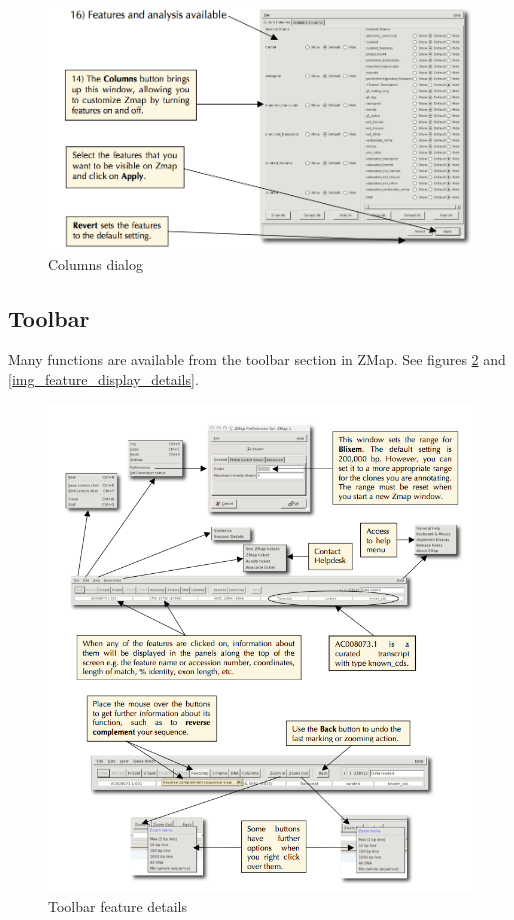 \documentclass[letterpaper]{article}
\begin{document}
\begin{figure}
\centering
\color[rgb]{0.30980393,0.5058824,0.7411765}
\includegraphics[width=15.231cm]{img_columns.png}
\caption{Columns dialog}
\label{img_columns}
\end{figure}


\subsection{Toolbar}
Many functions are available from the toolbar section in ZMap. See figures \ref{img_toolbar_feature_details} and \ref{img_feature_display_details}.

\begin{figure}
\centering
\color[rgb]{0.30980393,0.5058824,0.7411765}
\includegraphics[width=15.231cm]{img_toolbar_feature_details.png}
\caption{Toolbar feature details}
\label{img_toolbar_feature_details}
\end{figure}
\end{document}
